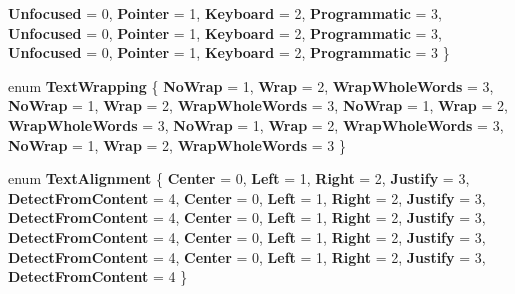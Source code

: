 \begin{DoxyCompactItemize}
{\bfseries Unfocused} = 0, 
{\bfseries Pointer} = 1, 
{\bfseries Keyboard} = 2, 
{\bfseries Programmatic} = 3, 
\newline
{\bfseries Unfocused} = 0, 
{\bfseries Pointer} = 1, 
{\bfseries Keyboard} = 2, 
{\bfseries Programmatic} = 3, 
\newline
{\bfseries Unfocused} = 0, 
{\bfseries Pointer} = 1, 
{\bfseries Keyboard} = 2, 
{\bfseries Programmatic} = 3
 \}
\item 
\mbox{\label{namespace_windows_1_1_u_i_1_1_xaml_aa8ebfd3700e5b390858676152a8a58e9}} 
enum {\bfseries Text\+Wrapping} \{ \newline
{\bfseries No\+Wrap} = 1, 
{\bfseries Wrap} = 2, 
{\bfseries Wrap\+Whole\+Words} = 3, 
{\bfseries No\+Wrap} = 1, 
\newline
{\bfseries Wrap} = 2, 
{\bfseries Wrap\+Whole\+Words} = 3, 
{\bfseries No\+Wrap} = 1, 
{\bfseries Wrap} = 2, 
\newline
{\bfseries Wrap\+Whole\+Words} = 3, 
{\bfseries No\+Wrap} = 1, 
{\bfseries Wrap} = 2, 
{\bfseries Wrap\+Whole\+Words} = 3, 
\newline
{\bfseries No\+Wrap} = 1, 
{\bfseries Wrap} = 2, 
{\bfseries Wrap\+Whole\+Words} = 3
 \}
\item 
\mbox{\label{namespace_windows_1_1_u_i_1_1_xaml_a096a1b0a726ae821c5a11e30eb861b63}} 
enum {\bfseries Text\+Alignment} \{ \newline
{\bfseries Center} = 0, 
{\bfseries Left} = 1, 
{\bfseries Right} = 2, 
{\bfseries Justify} = 3, 
\newline
{\bfseries Detect\+From\+Content} = 4, 
{\bfseries Center} = 0, 
{\bfseries Left} = 1, 
{\bfseries Right} = 2, 
\newline
{\bfseries Justify} = 3, 
{\bfseries Detect\+From\+Content} = 4, 
{\bfseries Center} = 0, 
{\bfseries Left} = 1, 
\newline
{\bfseries Right} = 2, 
{\bfseries Justify} = 3, 
{\bfseries Detect\+From\+Content} = 4, 
{\bfseries Center} = 0, 
\newline
{\bfseries Left} = 1, 
{\bfseries Right} = 2, 
{\bfseries Justify} = 3, 
{\bfseries Detect\+From\+Content} = 4, 
\newline
{\bfseries Center} = 0, 
{\bfseries Left} = 1, 
{\bfseries Right} = 2, 
{\bfseries Justify} = 3, 
\newline
{\bfseries Detect\+From\+Content} = 4
 \}

\end{DoxyCompactItemize}
